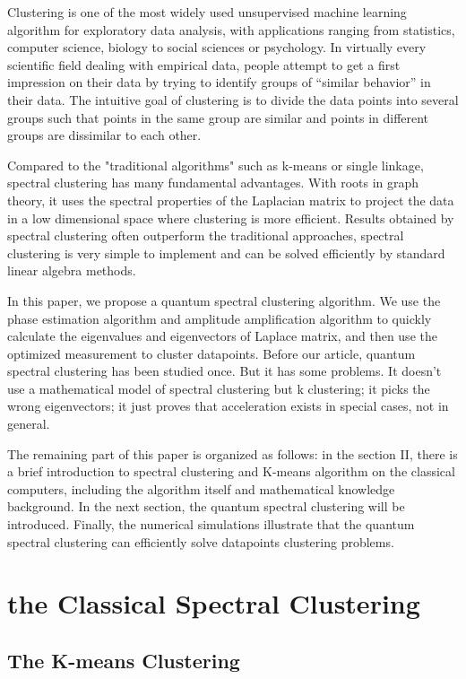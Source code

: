 \documentclass[twocolumn,notitlepage]{revtex4-1}
\begin{document}
Clustering is one of the most widely used unsupervised machine learning algorithm  for exploratory data analysis, with applications ranging from statistics, computer science, biology to social sciences or psychology. 
In virtually every scientific field dealing with empirical data, people attempt to get a first impression on their data by trying to identify groups of “similar behavior” in their data. 
The intuitive goal of clustering is to divide the data points into several groups such that points in the same group are similar and points in different groups are dissimilar to each other. 

Compared to the "traditional algorithms" such as k-means or single linkage, spectral clustering has many fundamental advantages. 
With roots in graph theory, it uses the spectral properties of the Laplacian matrix to project the data in a low dimensional space where clustering is more efficient. 
Results obtained by spectral clustering often outperform the traditional approaches, spectral clustering is very simple to implement and can be solved efficiently by standard linear algebra methods.

In this paper, we propose a quantum spectral clustering algorithm. We use the phase estimation algorithm and amplitude amplification algorithm to quickly calculate the eigenvalues and eigenvectors of Laplace matrix, and then use the optimized measurement to cluster datapoints. 
Before our article, quantum spectral clustering has been studied once. But it has some problems. It doesn't use a mathematical model of spectral clustering but k clustering; it picks the wrong eigenvectors; it just proves that acceleration exists in special cases, not in general.

The remaining part of this paper is organized as follows: in the section II, there is a brief introduction to spectral clustering and K-means algorithm on the classical computers, including the algorithm itself and mathematical knowledge background. In the next section, the quantum spectral clustering will be introduced. Finally, the numerical simulations illustrate that the quantum spectral clustering can efficiently solve datapoints clustering problems.


\section{the Classical Spectral Clustering}

\subsection{The K-means Clustering}
\end{document}
